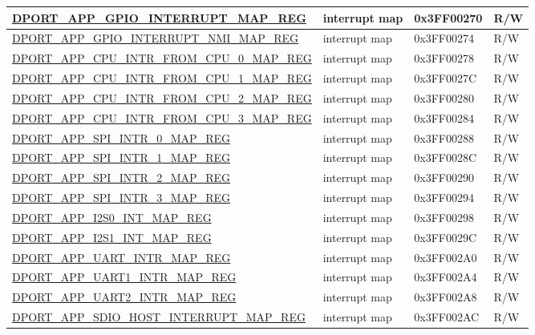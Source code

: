 \begin{longtable}{ |L{8.2cm} | L{4.5cm} | l | l | }
\hyperref[regdesc:APPGPIOINTERRUPTMAPREG]{DPORT\_APP\_GPIO\_INTERRUPT\_MAP\_REG} & interrupt map & 0x3FF00270 & R/W \\ \hline
\hyperref[regdesc:APPGPIOINTERRUPTNMIMAPREG]{DPORT\_APP\_GPIO\_INTERRUPT\_NMI\_MAP\_REG} & interrupt map & 0x3FF00274 & R/W \\ \hline
\hyperref[regdesc:APPCPUINTRFROMCPU0MAPREG]{DPORT\_APP\_CPU\_INTR\_FROM\_CPU\_0\_MAP\_REG} & interrupt map & 0x3FF00278 & R/W \\ \hline
\hyperref[regdesc:APPCPUINTRFROMCPU1MAPREG]{DPORT\_APP\_CPU\_INTR\_FROM\_CPU\_1\_MAP\_REG} & interrupt map & 0x3FF0027C & R/W \\ \hline
\hyperref[regdesc:APPCPUINTRFROMCPU2MAPREG]{DPORT\_APP\_CPU\_INTR\_FROM\_CPU\_2\_MAP\_REG} & interrupt map & 0x3FF00280 & R/W \\ \hline
\hyperref[regdesc:APPCPUINTRFROMCPU3MAPREG]{DPORT\_APP\_CPU\_INTR\_FROM\_CPU\_3\_MAP\_REG} & interrupt map & 0x3FF00284 & R/W \\ \hline
\hyperref[regdesc:APPSPIINTR0MAPREG]{DPORT\_APP\_SPI\_INTR\_0\_MAP\_REG} & interrupt map & 0x3FF00288 & R/W \\ \hline
\hyperref[regdesc:APPSPIINTR1MAPREG]{DPORT\_APP\_SPI\_INTR\_1\_MAP\_REG} & interrupt map & 0x3FF0028C & R/W \\ \hline
\hyperref[regdesc:APPSPIINTR2MAPREG]{DPORT\_APP\_SPI\_INTR\_2\_MAP\_REG} & interrupt map & 0x3FF00290 & R/W \\ \hline
\hyperref[regdesc:APPSPIINTR3MAPREG]{DPORT\_APP\_SPI\_INTR\_3\_MAP\_REG} & interrupt map & 0x3FF00294 & R/W \\ \hline
\hyperref[regdesc:APPI2S0INTMAPREG]{DPORT\_APP\_I2S0\_INT\_MAP\_REG} & interrupt map & 0x3FF00298 & R/W \\ \hline
\hyperref[regdesc:APPI2S1INTMAPREG]{DPORT\_APP\_I2S1\_INT\_MAP\_REG} & interrupt map & 0x3FF0029C & R/W \\ \hline
\hyperref[regdesc:APPUARTINTRMAPREG]{DPORT\_APP\_UART\_INTR\_MAP\_REG} & interrupt map & 0x3FF002A0 & R/W \\ \hline
\hyperref[regdesc:APPUART1INTRMAPREG]{DPORT\_APP\_UART1\_INTR\_MAP\_REG} & interrupt map & 0x3FF002A4 & R/W \\ \hline
\hyperref[regdesc:APPUART2INTRMAPREG]{DPORT\_APP\_UART2\_INTR\_MAP\_REG} & interrupt map & 0x3FF002A8 & R/W \\ \hline
\hyperref[regdesc:APPSDIOHOSTINTERRUPTMAPREG]{DPORT\_APP\_SDIO\_HOST\_INTERRUPT\_MAP\_REG} & interrupt map & 0x3FF002AC & R/W \\ \hline

\end{longtable}
